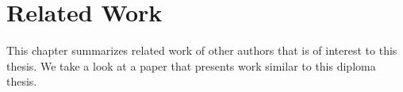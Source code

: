 \chapter{Related Work}
\label{related}

This chapter summarizes related work of other authors that is of interest to this thesis.
We take a look at a paper that presents work similar to this diploma thesis.



